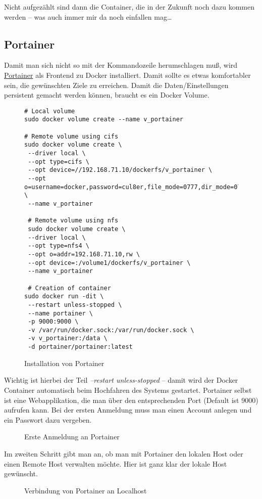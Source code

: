 \documentclass[12pt,a4paper,ngerman]{article}
\newcommand{\code}[1]{\textit{#1}}
\newcommand{\jpaimg}[2]{\begin{figure}[H]\centering\fbox{\texttt{[image: \#1]}}\caption{#2}\label{fig:#2}\end{figure}}
\newcommand{\jpacaption}[1]{\caption{#1}\label{fig:#1}}
\begin{document}
Nicht aufgezählt sind dann die Container, die in der Zukunft noch dazu kommen
werden -- was auch immer mir da noch einfallen mag\ldots

\subsection{Portainer}\label{sub:Portainer}
Damit man sich nicht so mit der Kommandozeile herumschlagen muß, wird
\href{https://hub.docker.com/r/portainer/portainer/}{Portainer} als Frontend zu
Docker installiert. Damit sollte es etwas komfortabler sein, die gewünschten
Ziele zu erreichen. Damit die Daten/Einstellungen persistent gemacht werden
können, braucht es ein Docker Volume.

\begin{figure}[H]
    \begin{lstlisting}
# Local volume
sudo docker volume create --name v_portainer

# Remote volume using cifs
sudo docker volume create \
 --driver local \
 --opt type=cifs \
 --opt device=//192.168.71.10/dockerfs/v_portainer \
 --opt o=username=docker,password=cul8er,file_mode=0777,dir_mode=0777 \
 --name v_portainer

 # Remote volume using nfs
 sudo docker volume create \
 --driver local \
 --opt type=nfs4 \
 --opt o=addr=192.168.71.10,rw \
 --opt device=:/volume1/dockerfs/v_portainer \
 --name v_portainer

 # Creation of container
sudo docker run -dit \
 --restart unless-stopped \
 --name portainer \
 -p 9000:9000 \
 -v /var/run/docker.sock:/var/run/docker.sock \
 -v v_portainer:/data \
 -d portainer/portainer:latest
\end{lstlisting}
    \jpacaption{Installation von Portainer}
\end{figure}

Wichtig ist hierbei der Teil \code{--restart unless-stopped} -- damit wird der
Docker Container automatisch beim Hochfahren des Systems gestartet. Portainer
selbst ist eine Webapplikation, die man über den entsprechenden Port (Default
ist 9000) aufrufen kann. Bei der ersten Anmeldung muss man einen Account anlegen
und ein Passwort dazu vergeben.

\jpaimg{./images/Portainer-01.png}{Erste Anmeldung an Portainer}

Im zweiten Schritt gibt man an, ob man mit Portainer den lokalen Host oder einen
Remote Host verwalten möchte. Hier ist ganz klar der lokale Host gewünscht.

\jpaimg{./images/Portainer-02.png}{Verbindung von Portainer an Localhost}
\end{document}
